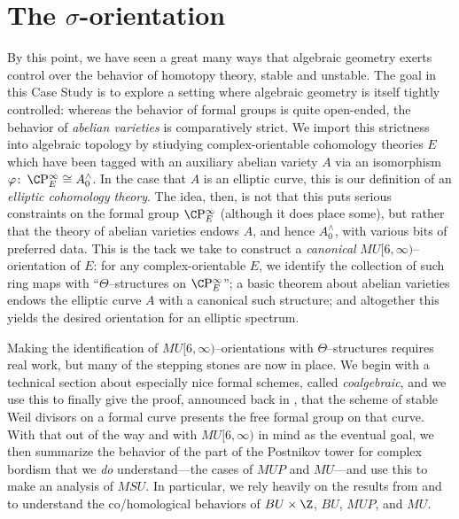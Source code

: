 
\chapter{The \texorpdfstring{$\sigma$}{sigma}-orientation}\label{ChapterSigmaOrientation}

By this point, we have seen a great many ways that algebraic geometry exerts control over the behavior of homotopy theory, stable and unstable.  The goal in this Case Study is to explore a setting where algebraic geometry is itself tightly controlled: whereas the behavior of formal groups is quite open-ended, the behavior of \emph{abelian varieties} is comparatively strict.  We import this strictness into algebraic topology by stiudying complex-orientable cohomology theories $E$ which have been tagged with an auxiliary abelian variety $A$ via an isomorphism $\phi\co \CP^\infty_E \cong A^\wedge_0$.  In the case that $A$ is an elliptic curve, this is our definition of an \textit{elliptic cohomology theory}.  The idea, then, is not that this puts serious constraints on the formal group $\CP^\infty_E$ (although it does place some), but rather that the theory of abelian varieties endows $A$, and hence $A^\wedge_0$, with various bits of preferred data.  This is the tack we take to construct a \emph{canonical} $MU[6, \infty)$--orientation of $E$: for any complex-orientable $E$, we identify the collection of such ring maps with ``$\Theta$--structures on $\CP^\infty_E$''; a basic theorem about abelian varieties endows the elliptic curve $A$ with a canonical such structure; and altogether this yields the desired orientation for an elliptic spectrum.

Making the identification of $MU[6, \infty)$--orientations with $\Theta$--structures requires real work, but many of the stepping stones are now in place.  We begin with a technical section about especially nice formal schemes, called \textit{coalgebraic}, and we use this to finally give the proof, announced back in , that the scheme of stable Weil divisors on a formal curve presents the free formal group on that curve.  With that out of the way and with $MU[6, \infty)$ in mind as the eventual goal, we then summarize the behavior of the part of the Postnikov tower for complex bordism that we \emph{do} understand---the cases of $MUP$ and $MU$---and use this to make an analysis of $MSU$.  In particular, we rely heavily on the results from  and  to understand the co/homological behaviors of $BU \times \Z$, $BU$, $MUP$, and $MU$.

